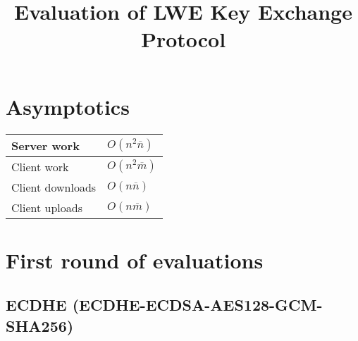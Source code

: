 \documentclass[12pt]{article}
\newcommand{\nbar}{\overline{n}}
\newcommand{\mbar}{\overline{m}}
\begin{document}
\title{Evaluation of LWE Key Exchange Protocol}
\maketitle

\section{Asymptotics}
\begin{center}
    \begin{tabular}{| l | l |}
    \hline
Server work & $O(n^2\nbar)$\\ \hline
Client work & $O(n^2\mbar)$\\ \hline
Client downloads & $O(n \nbar)$\\ \hline
Client uploads & $O(n \mbar)$\\ \hline
    \end{tabular}
\end{center}

\section{First round of evaluations}
\subsection{ECDHE \tiny{(ECDHE-ECDSA-AES128-GCM-SHA256)}}
\end{document}
